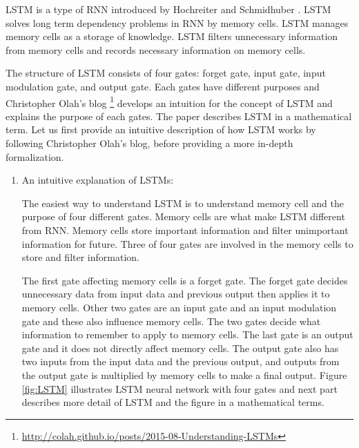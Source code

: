 \documentclass[draft,dvipsnames]{drexel-thesis}
\begin{document}
\begin{thesis}
	LSTM is a type of RNN introduced by Hochreiter and Schmidhuber \cite{hochreiter1997long}. LSTM solves long term dependency problems in RNN by memory cells. LSTM manages memory cells as a storage of knowledge. LSTM filters unnecessary information from memory cells and records necessary information on memory cells.

	The structure of LSTM consists of four gates: forget gate, input gate, input modulation gate, and output gate. Each gates have different purposes and Christopher Olah's blog \footnote{\url{http://colah.github.io/posts/2015-08-Understanding-LSTMs}} develops an intuition for the concept of LSTM and explains the purpose of each gates. The paper \cite{zaremba2014recurrent}  describes LSTM in a mathematical term. Let us first provide an intuitive description of how LSTM works by following Christopher Olah's blog, before providing a more in-depth formalization.



\begin{enumerate}
\item An intuitive explanation of LSTMs:

	The easiest way to understand LSTM is to understand memory cell and the purpose of four different gates. Memory cells are what make LSTM different from RNN. Memory cells store important information and filter unimportant information for future. Three of four gates are involved in the memory cells to store and filter information.

	The first gate affecting memory cells is a forget gate. The forget gate decides unnecessary data from input data and previous output then applies it to memory cells. Other two gates are an input gate and an input modulation gate and these also influence memory cells. The two gates decide what information to remember to apply to memory cells. The last gate is an output gate and it does not directly affect memory cells. The output gate also has two inputs from the input data and the previous output, and outputs from the output gate is multiplied by memory cells to make a final output. Figure \ref{fig:LSTM} illustrates LSTM neural network with four gates and next part describes more detail of LSTM and the figure in a mathematical terms.


\end{enumerate}
\end{thesis}
\end{document}
